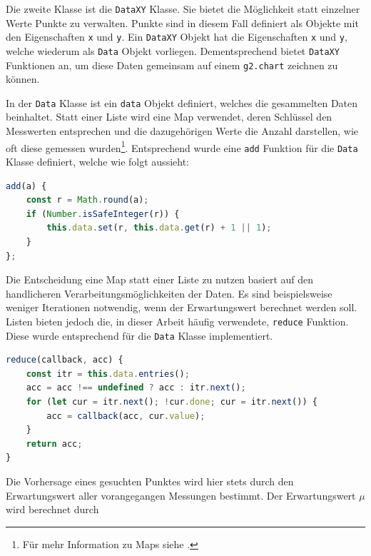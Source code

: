 Die zweite Klasse ist die \lstinline{DataXY} Klasse.
Sie bietet die Möglichkeit statt einzelner Werte Punkte zu verwalten.
Punkte sind in diesem Fall definiert als Objekte mit den Eigenschaften \lstinline{x} und \lstinline{y}.
Ein \lstinline{DataXY} Objekt hat die Eigenschaften \lstinline{x} und \lstinline{y}, welche wiederum als \lstinline{Data} Objekt vorliegen.
Dementsprechend bietet \lstinline{DataXY} Funktionen an, um diese Daten gemeinsam auf einem \lstinline{g2.chart} zeichnen zu können.

In der \lstinline{Data} Klasse ist ein \lstinline{data} Objekt definiert, welches die gesammelten Daten beinhaltet.
Statt einer Liste wird eine Map verwendet, deren Schlüssel den Messwerten entsprechen und die dazugehörigen Werte die Anzahl darstellen, wie oft diese gemessen wurden\footnote{Für mehr Information zu Maps siehe .}.
Entsprechend wurde eine \lstinline{add} Funktion für die \lstinline{Data} Klasse definiert, welche wie folgt aussieht:

\begin{lstlisting}[language=JavaScript, caption={Definition der \lstinline{add} Funktion, welche dazu genutzt wird der \lstinline{Data} Klasse neue Werte hinzuzufügen}, label={lst:data_add}]
add(a) {
    const r = Math.round(a);
    if (Number.isSafeInteger(r)) {
        this.data.set(r, this.data.get(r) + 1 || 1);
    }
};
\end{lstlisting}

Die Entscheidung eine Map statt einer Liste zu nutzen basiert auf den handlicheren Verarbeitungsmöglichkeiten der Daten.
Es sind beispielsweise weniger Iterationen notwendig, wenn der Erwartungswert berechnet werden soll.
Listen bieten jedoch die, in dieser Arbeit häufig verwendete, \lstinline{reduce} Funktion.
Diese wurde entsprechend für die \lstinline{Data} Klasse implementiert.

\begin{lstlisting}[language=JavaScript, caption={Definition der \lstinline{reduce} Funktion, um die Standardfunktion der Liste nachzubilden}, label={lst:data_reduce}]
reduce(callback, acc) {
    const itr = this.data.entries();
    acc = acc !== undefined ? acc : itr.next();
    for (let cur = itr.next(); !cur.done; cur = itr.next()) {
        acc = callback(acc, cur.value);
    }
    return acc;
}
\end{lstlisting}

Die Vorhersage eines gesuchten Punktes wird hier stets durch den Erwartungswert aller vorangegangen Messungen bestimmt.
Der Erwartungswert $\mu$ wird berechnet durch~\cite[S.~143]{KlausEden2014}

